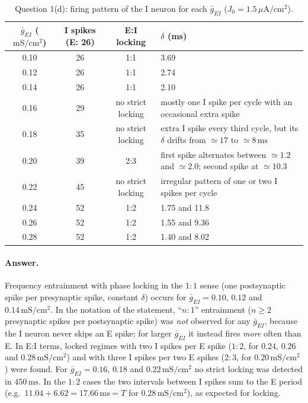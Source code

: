 \documentclass[12pt]{article}
\newcommand{\ms}{\,\mathrm{ms}}
\newcommand{\gu}{\,\mathrm{mS/cm^2}}
\newcommand{\Ju}{\,\mu\mathrm{A/cm^2}}
\begin{document}
\begin{table}[H]
\centering
\begin{tabular}{cccp{}}
\toprule
$\bar g_{EI}$ ($\mathrm{mS/cm^2}$) & I spikes (E: 26) & E:I locking & $\delta$ (ms)\\
\midrule
0.10 & 26 & 1:1 & 3.69\\
0.12 & 26 & 1:1 & 2.74\\
0.14 & 26 & 1:1 & 2.10\\
0.16 & 29 & no strict locking & mostly one I spike per cycle with an occasional extra spike\\
0.18 & 35 & no strict locking & extra I spike every third cycle, but its $\delta$ drifts from $\simeq17$ to $\simeq8\ms$\\
0.20 & 39 & 2:3 & first spike alternates between $\simeq1.2$ and $\simeq2.0$; second spike at $\simeq10.3$\\
0.22 & 45 & no strict locking & irregular pattern of one or two I spikes per cycle\\
0.24 & 52 & 1:2 & 1.75 and 11.8\\
0.26 & 52 & 1:2 & 1.55 and 9.36\\
0.28 & 52 & 1:2 & 1.40 and 8.02\\
\bottomrule
\end{tabular}
\caption{Question 1(d): firing pattern of the I neuron for each $\bar g_{EI}$ ($J_0=1.5\Ju$).}
\label{tab:q1d}
\end{table}

\paragraph{Answer.} Frequency entrainment with phase locking in the $1{:}1$ sense (one postsynaptic spike per presynaptic spike, constant $\delta$) occurs for $\bar g_{EI}=0.10$, $0.12$ and $0.14\gu$. In the notation of the statement, ``$n{:}1$'' entrainment ($n\ge2$ presynaptic spikes per postsynaptic spike) was \emph{not} observed for any $\bar g_{EI}$, because the I neuron never skips an E spike; for larger $\bar g_{EI}$ it instead fires \emph{more} often than E. In E:I terms, locked regimes with two I spikes per E spike ($1{:}2$, for $0.24$, $0.26$ and $0.28\gu$) and with three I spikes per two E spikes ($2{:}3$, for $0.20\gu$) were found. For $\bar g_{EI}=0.16$, $0.18$ and $0.22\gu$ no strict locking was detected in $450\ms$. In the $1{:}2$ cases the two intervals between I spikes sum to the E period (e.g.\ $11.04+6.62=17.66\ms=T$ for $0.28\gu$), as expected for locking.
\end{document}
